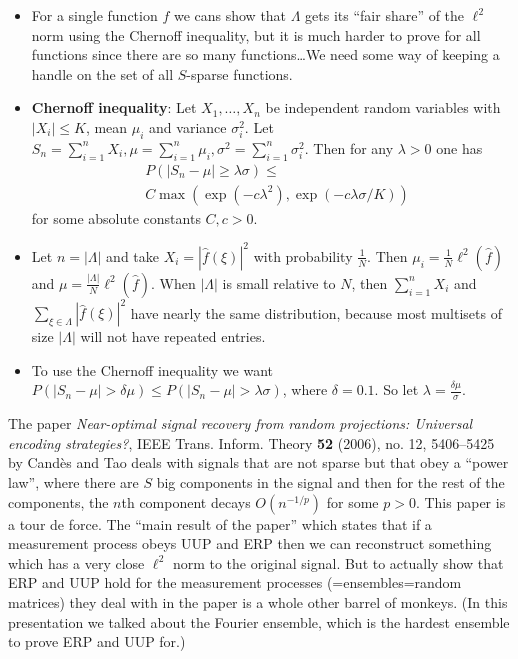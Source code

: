 \documentclass{slides}
\begin{document}
\begin{slide}
\begin{itemize}
\item For a single function $f$ we cans show that $\Lambda$ gets its ``fair share''
of the $\ell^2$ norm using the Chernoff inequality, but it is much harder
to prove for all functions since there are so many functions\ldots We
need some way of keeping a handle on the set of all $S$-sparse functions.

\item \textbf{Chernoff inequality}: Let $X_1,\ldots,X_n$ be independent
random variables with $|X_i| \leq K$, mean $\mu_i$ and variance $\sigma_i^2$.
Let $S_n=\sum_{i=1}^n X_i, \mu=\sum_{i=1}^n\mu_i, \sigma^2=\sum_{i=1}^n \sigma_i^2$.
Then for any $\lambda>0$ one has
\[
\begin{split}
&P(|S_n-\mu| \geq \lambda \sigma) \leq\\
&C\max(\exp(-c\lambda^2),\exp(-c\lambda\sigma /K))
\end{split}
\]
for some absolute constants $C,c>0$.
\end{itemize}
\end{slide}

\begin{slide}
\begin{itemize}
\item Let $n=|\Lambda|$ and take $X_i=|\hat{f}(\xi)|^2$ with probability $\frac{1}{N}$. Then
$\mu_i=\frac{1}{N}\ell^2(\hat{f})$ and $\mu=\frac{|\Lambda|}{N}\ell^2(\hat{f})$.
When $|\Lambda|$ is small relative to $N$, then $\sum_{i=1}^n X_i$ and
$\sum_{\xi \in \Lambda}|\hat{f}(\xi)|^2$ have nearly the same distribution,
because most multisets of size $|\Lambda|$ will not have repeated entries.

\item To use the Chernoff inequality we want $P(|S_n-\mu|>\delta \mu) \leq
P(|S_n-\mu| > \lambda \sigma)$, where $\delta=0.1$. So let $\lambda=\frac{\delta \mu}{\sigma}$.
\end{itemize}
\end{slide}

\begin{slide}
The paper {\em Near-optimal signal recovery from random projections:
Universal encoding strategies?}, IEEE Trans. Inform. Theory \textbf{52}
(2006), no. 12, 5406--5425 by Cand\`es and Tao deals with signals that
are not sparse but that obey a ``power law'', where there are $S$ big
components in the signal and then for the rest of the components, the $n$th
component decays $O(n^{-1/p})$ for some $p>0$. This paper
is a tour de force. The ``main result of the paper'' which states
that if a measurement process obeys UUP and ERP then
we can reconstruct something which has a very close $\ell^2$ norm to
the original signal. But to actually show that ERP and UUP hold for
the measurement processes (=ensembles=random matrices) they deal with in
the paper is a whole other barrel of monkeys.
(In this presentation we talked about the Fourier ensemble, which
is the hardest ensemble to prove ERP and UUP for.)
\end{slide}
\end{document}
